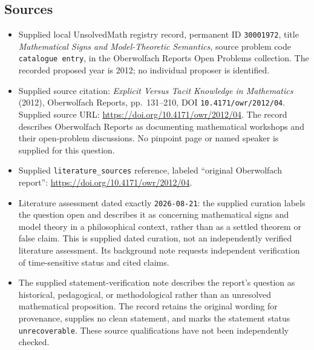 \documentclass[11pt]{article}
\begin{document}
\subsection{Sources}
\begin{itemize}
\item Supplied local UnsolvedMath registry record, permanent ID \texttt{30001972}, title \emph{Mathematical Signs and Model-Theoretic Semantics}, source problem code \texttt{catalogue entry}, in the Oberwolfach Reports Open Problems collection. The recorded proposed year is 2012; no individual proposer is identified.
\item Supplied source citation: \emph{Explicit Versus Tacit Knowledge in Mathematics} (2012), Oberwolfach Reports, pp.~131--210, DOI \texttt{10.4171/owr/2012/04}. Supplied source URL: \url{https://doi.org/10.4171/owr/2012/04}. The record describes Oberwolfach Reports as documenting mathematical workshops and their open-problem discussions. No pinpoint page or named speaker is supplied for this question.
\item Supplied \texttt{literature\_sources} reference, labeled ``original Oberwolfach report'': \url{https://doi.org/10.4171/owr/2012/04}.
\item Literature assessment dated exactly \texttt{2026-08-21}: the supplied curation labels the question open and describes it as concerning mathematical signs and model theory in a philosophical context, rather than as a settled theorem or false claim. This is supplied dated curation, not an independently verified literature assessment. Its background note requests independent verification of time-sensitive status and cited claims.
\item The supplied statement-verification note describes the report's question as historical, pedagogical, or methodological rather than an unresolved mathematical proposition. The record retains the original wording for provenance, supplies no clean statement, and marks the statement status \texttt{unrecoverable}. These source qualifications have not been independently checked.
\end{itemize}
\end{document}
